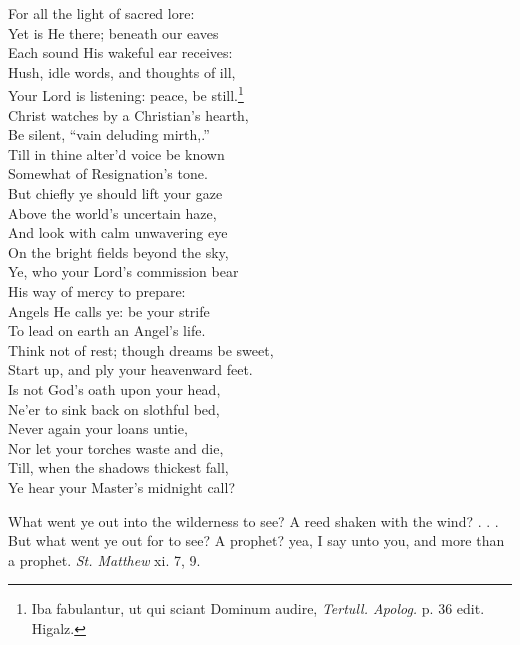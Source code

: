  For all the light of sacred lore: \\
  Yet is He there; beneath our eaves \\
 Each sound His wakeful ear receives: \\
 Hush, idle words, and thoughts of ill, \\
 Your Lord is listening: peace, be still.\footnote{Iba fabulantur, ut qui sciant Dominum audire, \emph{Tertull. Apolog.} p. 36 edit. Higalz.} \\
 Christ watches by a Christian’s hearth, \\
 Be silent, “vain deluding mirth,.” \\
 Till in thine alter’d voice be known \\
 Somewhat of Resignation’s tone. \\
  But chiefly ye should lift your gaze \\
 Above the world’s uncertain haze, \\
 And look with calm unwavering eye \\
 On the bright fields beyond the sky, \\
 Ye, who your Lord’s commission bear \\
 His way of mercy to prepare: \\
 Angels He calls ye: be your strife \\
 To lead on earth an Angel’s life. \\
  Think not of rest; though dreams be sweet, \\
 Start up, and ply your heavenward feet. \\
 Is not God’s oath upon your head, \\
 Ne’er to sink back on slothful bed, \\
 Never again your loans untie, \\
 Nor let your torches waste and die, \\
 Till, when the shadows thickest fall, \\
 Ye hear your Master’s midnight call?\\


What went ye out into the wilderness to see? A reed shaken with the wind? . . . But what went ye out for to see? A prophet? yea, I say unto you, and more than a prophet. \emph{St. Matthew} xi. 7, 9.

